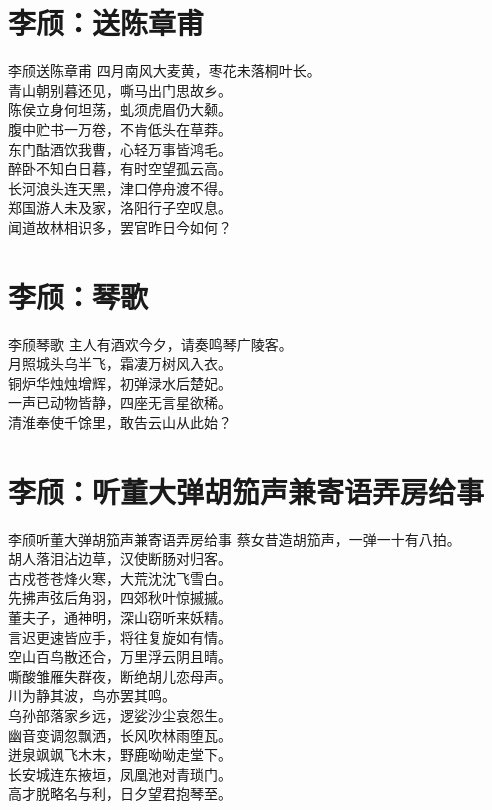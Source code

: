 \documentclass[12pt,oneside,a5paper]{book}
\begin{document}
\chapter{李颀：送陈章甫}
\begin{poemzh}{李颀}{送陈章甫}
四月南风大麦黄，枣花未落桐叶长。\\
青山朝别暮还见，嘶马出门思故乡。\\
陈侯立身何坦荡，虬须虎眉仍大颡。\\
腹中贮书一万卷，不肯低头在草莽。\\
东门酤酒饮我曹，心轻万事皆鸿毛。\\
醉卧不知白日暮，有时空望孤云高。\\
长河浪头连天黑，津口停舟渡不得。\\
郑国游人未及家，洛阳行子空叹息。\\
闻道故林相识多，罢官昨日今如何？\\ 
\end{poemzh}

\chapter{李颀：琴歌}
\begin{poemzh}{李颀}{琴歌}
主人有酒欢今夕，请奏鸣琴广陵客。\\
月照城头乌半飞，霜凄万树风入衣。\\
铜炉华烛烛增辉，初弹渌水后楚妃。\\
一声已动物皆静，四座无言星欲稀。\\
清淮奉使千馀里，敢告云山从此始？\\ 
\end{poemzh}

\chapter{李颀：听董大弹胡笳声兼寄语弄房给事}
\begin{poemzh}{李颀}{听董大弹胡笳声兼寄语弄房给事}
蔡女昔造胡笳声，一弹一十有八拍。\\
胡人落泪沾边草，汉使断肠对归客。\\
古戍苍苍烽火寒，大荒沈沈飞雪白。\\
先拂声弦后角羽，四郊秋叶惊摵摵。\\
董夫子，通神明，深山窃听来妖精。\\
言迟更速皆应手，将往复旋如有情。\\
空山百鸟散还合，万里浮云阴且晴。\\
嘶酸雏雁失群夜，断绝胡儿恋母声。\\
川为静其波，鸟亦罢其鸣。\\
乌孙部落家乡远，逻娑沙尘哀怨生。\\
幽音变调忽飘洒，长风吹林雨堕瓦。\\
迸泉飒飒飞木末，野鹿呦呦走堂下。\\
长安城连东掖垣，凤凰池对青琐门。\\
高才脱略名与利，日夕望君抱琴至。\\ 
\end{poemzh}
\end{document}

